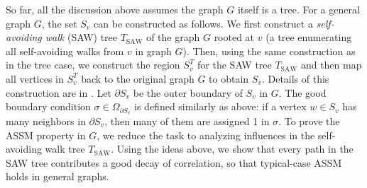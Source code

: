 \documentclass[11pt]{amsart}
\theoremstyle{definition}
\theoremstyle{remark}
\begin{document}
So far, all the discussion above assumes the graph $G$ itself is a tree. For a general graph $G$, the set $S_v$ can be constructed as follows.
We first construct a \emph{self-avoiding walk} (SAW) tree $T_{\text{SAW}}$ of the graph $G$ rooted at $v$ (a tree enumerating all self-avoiding walks from $v$ in graph $G$). Then, using the same construction as in the tree case, we construct the region $S_v^T$ for the SAW tree $T_{\text{SAW}}$ and then map all vertices in $S_v^T$ back to the original graph $G$ to obtain $S_v$. 
Details of this construction are in .
Let $\partial S_v$ be the outer boundary of $S_v$ in $G$. The good boundary condition $\sigma \in \Omega_{\partial S_v}$ is defined similarly as above: if a vertex $w \in S_v$ has many neighbors in $\partial S_v$, then many of them are assigned 1 in $\sigma$.
To prove the ASSM property in $G$, we reduce the task to analyzing influences in the self-avoiding walk tree $T_{\text{SAW}}$. 
Using the ideas above, we show that every path in the SAW tree contributes a good decay of correlation, so that typical-case ASSM holds in general graphs.











\end{document}
